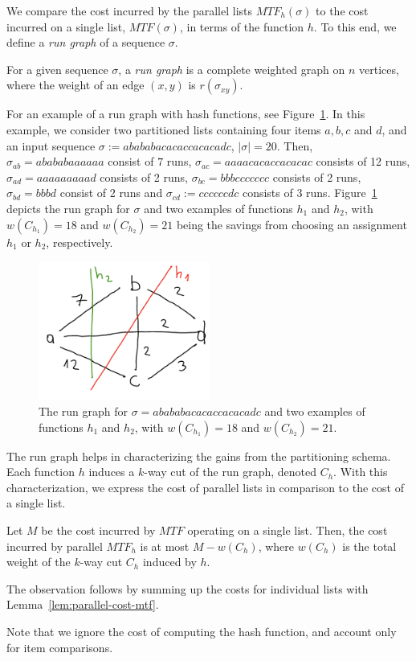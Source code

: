 We compare the cost incurred by the parallel lists $MTF_h(\sigma)$ to the cost incurred on a single list, $MTF(\sigma)$, in terms of the function $h$.
To this end, we define a \emph{run graph} of a sequence $\sigma$.
\begin{definition}
	For a given sequence $\sigma$, a \emph{run graph} is a complete weighted graph on $n$ vertices, where the weight of an edge $(x,y)$ is $r(\sigma_{xy})$.
\end{definition}

For an example of a run graph with hash functions, see Figure~\ref{fig:example}.
In this example, we consider two partitioned lists containing four items $a,b,c$ and $d$, and an input sequence $\sigma := abababacacaccacacadc$, $|\sigma| = 20$.
Then, $\sigma_{ab} = abababaaaaaa$ consist of $7$ runs, $\sigma_{ac} = aaaacacaccacacac$ consists of 12 runs, 
$\sigma_{ad} = aaaaaaaaad$ consists of 2 runs, 
$\sigma_{bc} = bbbccccccc$ consists of 2 runs,  $\sigma_{bd} = bbbd$ consist of 2 runs and $\sigma_{cd} := ccccccdc$ consists of 3 runs.
Figure~\ref{fig:example} depicts the run graph for $\sigma$ and two examples of functions $h_1$ and $h_2$, with $w(C_{h_1}) = 18$ and $w(C_{h_2}) = 21$ being the savings from choosing an assignment $h_1$ or $h_2$, respectively.


\begin{figure}[h!]
	\center
	\includegraphics[width=0.5\textwidth]{./fig/cut.png}
	\caption{The run graph for $\sigma = abababacacaccacacadc$ and two examples of functions $h_1$ and $h_2$, with $w(C_{h_1}) = 18$ and $w(C_{h_2}) = 21$.}
	\label{fig:example}
\end{figure}




The run graph helps in characterizing the gains from the partitioning schema.
Each function $h$ induces a $k$-way cut of the run graph, denoted $C_h$.
With this characterization, we express the cost of parallel lists in comparison to the cost of a single list.
\begin{observation}
	Let $M$ be the cost incurred by $MTF$ operating on a single list.
	Then, the cost incurred by parallel $MTF_h$ is at most $M - w(C_h)$, where $w(C_h)$ is the total weight of the $k$-way cut $C_h$ induced by $h$.
\end{observation}

The observation follows by summing up the costs for individual lists with Lemma~\ref{lem:parallel-cost-mtf}.

Note that we ignore the cost of computing the hash function, and account only for item comparisons.


